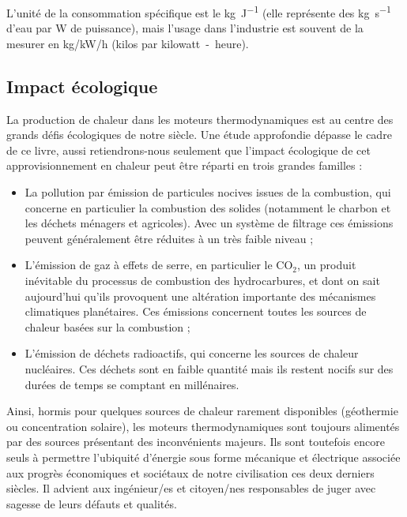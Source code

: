 		L’unité de la consommation spécifique est le \si{\kilogram\per\joule} (elle représente des \si{\kilogram\per\second} d’eau par \si{\watt} de puissance), mais l’usage dans l’industrie est souvent de la mesurer en \si[per-mode = symbol]{\kilogram\per\kilo\watt\per\hour} (\si{kilos} par \si{kilowatt-heure}).


	\subsection{Impact écologique}
	
		La production de chaleur dans les moteurs thermodynamiques est au centre des grands défis écologiques de notre siècle. Une étude approfondie dépasse le cadre de ce livre, aussi retiendrons-nous seulement que l’impact écologique de cet approvisionnement en chaleur peut être réparti en trois grandes familles :
		\begin{itemize}
			\item La pollution par émission de particules nocives issues de la combustion, qui concerne en particulier la combustion des solides (notamment le charbon et les déchets ménagers et agricoles). Avec un système de filtrage ces émissions peuvent généralement être réduites à un très faible niveau ;
			\item L’émission de gaz à effets de serre, en particulier le $\text{CO}_2$, un produit inévitable du processus de combustion des hydrocarbures, et dont on sait aujourd’hui qu’ils provoquent une altération importante des mécanismes climatiques planétaires. Ces émissions concernent toutes les sources de chaleur basées sur la combustion ;
			\item L’émission de déchets radioactifs, qui concerne les sources de chaleur nucléaires. Ces déchets sont en faible quantité mais ils restent nocifs sur des durées de temps se comptant en millénaires.
		\end{itemize}

		Ainsi, hormis pour quelques sources de chaleur rarement disponibles (géothermie ou concentration solaire), les moteurs thermodynamiques sont toujours alimentés par des sources présentant des inconvénients majeurs. Ils sont toutefois encore seuls à permettre l’ubiquité d’énergie sous forme mécanique et électrique associée aux progrès économiques et sociétaux de notre civilisation ces deux derniers siècles. Il advient aux ingénieur/es et citoyen/nes responsables de juger avec sagesse de leurs défauts et qualités.


